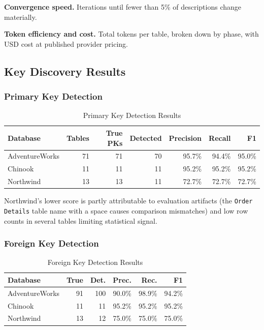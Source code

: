 \documentclass[twocolumn]{svjour3}
\begin{document}
\textbf{Convergence speed.} Iterations until fewer than 5\% of descriptions change materially.

\textbf{Token efficiency and cost.} Total tokens per table, broken down by phase, with USD cost at published provider pricing.

\subsection{Key Discovery Results}

\subsubsection{Primary Key Detection}

\begin{table}[htbp]
\caption{Primary Key Detection Results}
\label{tab:pk}
\centering
\begin{tabular}{lrrrrrr}
\toprule
\textbf{Database} & \textbf{Tables} & \textbf{True PKs} & \textbf{Detected} & \textbf{Precision} & \textbf{Recall} & \textbf{F1} \\
\midrule
AdventureWorks & 71 & 71 & 70 & 95.7\% & 94.4\% & 95.0\% \\
Chinook & 11 & 11 & 11 & 95.2\% & 95.2\% & 95.2\% \\
Northwind & 13 & 13 & 11 & 72.7\% & 72.7\% & 72.7\% \\
\bottomrule
\end{tabular}
\end{table}

Northwind's lower score is partly attributable to evaluation artifacts (the \texttt{Order Details} table name with a space causes comparison mismatches) and low row counts in several tables limiting statistical signal.

\subsubsection{Foreign Key Detection}

\begin{table}[htbp]
\caption{Foreign Key Detection Results}
\label{tab:fk}
\centering
\begin{tabular}{lrrrrr}
\toprule
\textbf{Database} & \textbf{True} & \textbf{Det.} & \textbf{Prec.} & \textbf{Rec.} & \textbf{F1} \\
\midrule
AdventureWorks & 91 & 100 & 90.0\% & 98.9\% & 94.2\% \\
Chinook & 11 & 11 & 95.2\% & 95.2\% & 95.2\% \\
Northwind & 13 & 12 & 75.0\% & 75.0\% & 75.0\% \\
\bottomrule
\end{tabular}
\end{table}
\end{document}
